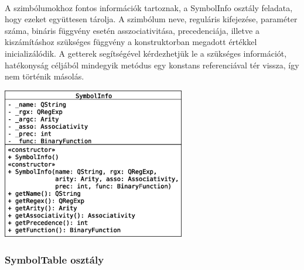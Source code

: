 \documentclass[12pt]{report}
\begin{document}
\paragraph{}
A szimbólumokhoz fontos információk tartoznak, a SymbolInfo osztály feladata, hogy ezeket együttesen tárolja. A szimbólum neve, reguláris kifejezése, paraméter száma, bináris függvény esetén asszociativitása, precedenciája, illetve a kiszámításhoz szükséges függvény a konstruktorban megadott értékkel inicializálódik. A getterek segítségével kérdezhetjük le a szükséges információt, hatékonyság céljából mindegyik metódus egy konstans referenciával tér vissza, így nem történik másolás.
\begin{center}
\includegraphics[width=8cm]{pics/uml/SymbolInfo}
\end{center}
\subsubsection{SymbolTable osztály}
\end{document}
